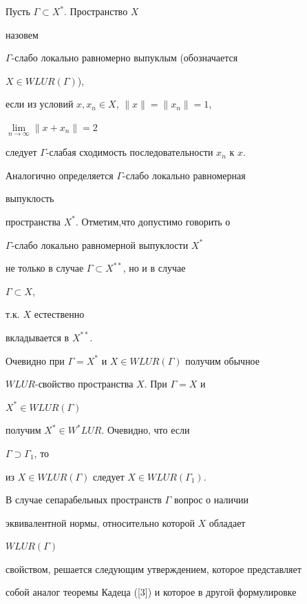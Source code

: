  


\begin{defnnonum} Пусть $\Gamma\subset X^*$. Пространство $X$ 


назовем 


$\Gamma$-слабо локально равномерно выпуклым (обозначается 


$X\in WLUR(\Gamma)$), 


если из условий $x,x_n\in X$, $\|x\|=\|x_n\|=1$, 


$\lim\limits_{n\to\infty}\|x+x_n\|=2$ 


следует $\Gamma$-слабая сходимость последовательности $x_n$ к $x$. 


\end{defnnonum} 


 


Аналогично определяется $\Gamma$-слабо локально равномерная 


выпуклость 


пространства $X^*$. Отметим,что допустимо говорить о 


$\Gamma$-слабо локально равномерной выпуклости $X^*$ 


не только в случае $\Gamma\subset X^{**}$, но и в случае 


$\Gamma\subset X$, 


т.к. $X$ естественно 


вкладывается в $X^{**}$. 


 


Очевидно при $\Gamma=X^*$ и $X\in WLUR(\Gamma)$ получим обычное 


$WLUR$-свойство пространства $X$. При $\Gamma=X$ и 


$X^*\in WLUR(\Gamma)$ 


получим $X^*\in W^*LUR$. Очевидно, что если 


$\Gamma\supset\Gamma_1$, то 


из $X\in WLUR(\Gamma)$ следует $X\in WLUR(\Gamma_1)$. 


 


В случае сепарабельных пространств $\Gamma$ вопрос о наличии 


эквивалентной нормы, относительно которой $X$ обладает 


$WLUR(\Gamma)$ 


свойством, решается следующим утверждением, которое представляет 


собой аналог теоремы Кадеца ([3]) и которое в другой формулировке 


